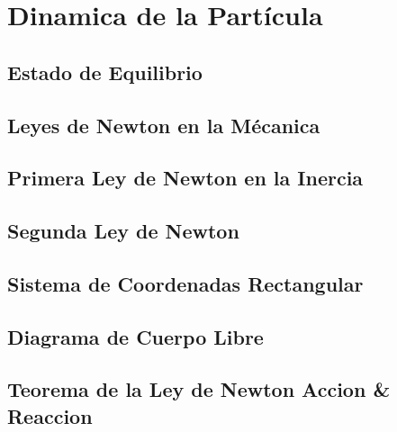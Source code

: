 \chapter{Dinamica de la Partícula}

\section{Estado de Equilibrio}

\newpage
\section{Leyes de Newton en la Mécanica}

\newpage
\section{Primera Ley de Newton en la Inercia}

\newpage
\section{Segunda Ley de Newton}

\newpage
\section{Sistema de Coordenadas Rectangular}

\newpage
\section{Diagrama de Cuerpo Libre}

\newpage
\section{Teorema de la Ley de Newton Accion \& Reaccion}
